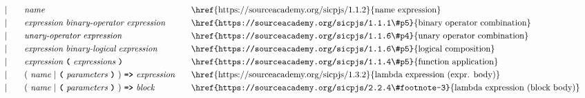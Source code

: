 \begin{alignat*}{9}
&&                       && |   &\quad &&  \textit{name}   && \textrm{\href{https://sourceacademy.org/sicpjs/1.1.2}{name expression}} \\
&&                       && |   &\quad &&  \textit{expression} \  \textit{binary-operator} \ 
                                            \textit{expression} \qquad
                                                           && \textrm{\href{https://sourceacademy.org/sicpjs/1.1.1\#p5}{binary operator combination}} \\
&&                       && |   &\quad &&   \textit{unary-operator} \ 
                                            \textit{expression}
                                                           && \textrm{\href{https://sourceacademy.org/sicpjs/1.1.6\#p4}{unary operator combination}}\\
&&                       && |   &\quad &&  \textit{expression} \  \textit{binary-logical} \ 
                                            \textit{expression} \qquad
                                                           && \textrm{\href{https://sourceacademy.org/sicpjs/1.1.6\#p5}{logical composition}}\\
&&                       && |   &\quad &&   \textit{expression} \ 
                                            \textbf{\texttt{(}}\ \textit{expressions}\
                                            \textbf{\texttt{)}}
                                                           && \textrm{\href{https://sourceacademy.org/sicpjs/1.1.4\#p5}{function application}} \\
&&                       && |   &\quad &&   (\ \textit{name}\ | \
                                               \textbf{\texttt{(}}\ \textit{parameters}\ \textbf{\texttt{)}}\
                                            )\    
                                            \texttt{\textbf{=>}}\ \textit{expression}
                                                           && \textrm{\href{https://sourceacademy.org/sicpjs/1.3.2}{lambda expression (expr. body)}} \\
&&                       && |   &\quad &&   (\ \textit{name}\ | \
                                               \textbf{\texttt{(}}\ \textit{parameters}\ \textbf{\texttt{)}}\
                                            )\    
                                            \texttt{\textbf{=>}}\ \textit{block}
                                                           && \textrm{\href{https://sourceacademy.org/sicpjs/2.2.4\#footnote-3}{lambda expression (block body)}} \\

\end{alignat*}
